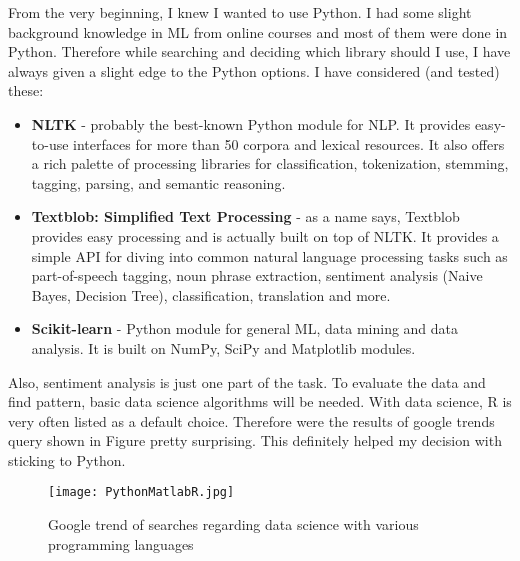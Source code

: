 From the very beginning, I knew I wanted to use Python. I had some slight background knowledge in ML from online courses and most of them were done in Python. Therefore while searching and deciding which library should I use, I have always given a slight edge to the Python options. I have considered (and tested) these:
\begin{itemize}
\item \textbf{NLTK} - probably the best-known Python module for NLP. It provides easy-to-use interfaces for more than 50 corpora and lexical resources. It also offers a rich palette of processing libraries for classification, tokenization, stemming, tagging, parsing, and semantic reasoning.
\item \textbf{Textblob: Simplified Text Processing} - as a name says, Textblob provides easy processing and is actually built on top of NLTK. It provides a simple API for diving into common natural language processing tasks such as part-of-speech tagging, noun phrase extraction, sentiment analysis (Naive Bayes, Decision Tree), classification, translation and more.
\item \textbf{Scikit-learn} - Python module for general ML, data mining and data analysis. It is built on NumPy, SciPy and Matplotlib modules.
\end{itemize}

Also, sentiment analysis is just one part of the task. To evaluate the data and find pattern, basic data science algorithms will be needed. With data science, R is very often listed as a default choice. Therefore were the results of google trends query shown in Figure  pretty surprising. This definitely helped my decision with sticking to Python.

\begin{figure}[H]%
    \centering
	\texttt{[image: PythonMatlabR.jpg]}
    \caption{Google trend of searches regarding data science with various programming languages}%
    \label{fig:PythonMatlabR}%
\end{figure}
